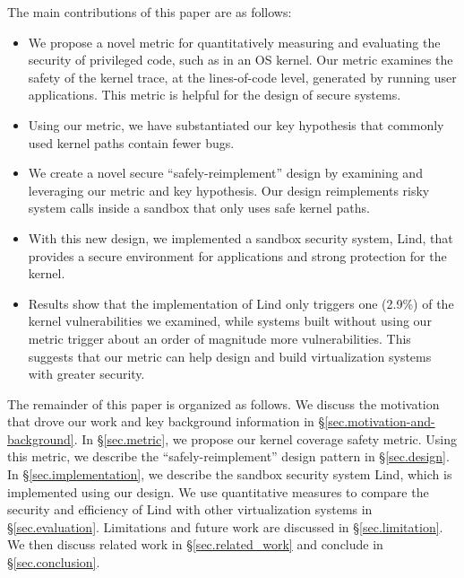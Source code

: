 The main contributions of this paper are as follows: %
\begin{itemize}
\item We propose a novel metric for quantitatively measuring and evaluating the
security of privileged code, such as in an OS kernel. Our metric examines
the safety of the kernel trace, at the lines-of-code level, generated by
running user applications. This metric is helpful for the design of secure systems.
\item Using our metric, we have substantiated our key hypothesis that commonly
used kernel paths contain fewer bugs. 
\item We create a novel secure ``safely-reimplement'' design by examining and
leveraging our metric and key hypothesis. 
Our design reimplements risky system calls inside a
sandbox that only uses safe kernel paths. 
\item With this new design, we implemented a sandbox security system, Lind, that
provides a secure environment for applications and strong protection for
the kernel.
\item Results show that the implementation of Lind only triggers one (2.9\%) of
the kernel vulnerabilities we examined, while systems built without using
our metric trigger about an order of magnitude more vulnerabilities. This
suggests that our metric can help design and build virtualization systems
with greater security. 
\end{itemize}


The remainder of this paper is organized as follows. 
We discuss the motivation that drove our work and key background information 
in \S{\ref{sec.motivation-and-background}}. 
In \S{\ref{sec.metric}}, we propose our kernel coverage safety metric. 
Using this metric, we describe the 
``safely-reimplement'' design pattern in \S{\ref{sec.design}}. In 
\S{\ref{sec.implementation}}, we describe the sandbox security 
system Lind, which is implemented using our design. We use quantitative 
measures to compare the security and efficiency of Lind with other 
virtualization systems in \S{\ref{sec.evaluation}}. 
Limitations and future work are discussed in \S{\ref{sec.limitation}}.  
We then discuss related work in \S{\ref{sec.related_work}} and conclude
in \S{\ref{sec.conclusion}}.

